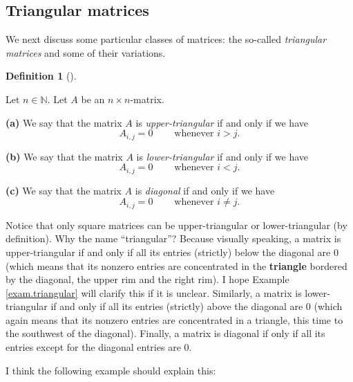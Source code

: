 \documentclass[numbers=enddot,12pt,final,onecolumn,notitlepage]{scrartcl}%
\theoremstyle{definition}
\newtheorem{defi}[theo]{Definition}
\newenvironment{definition}[1][]
{\begin{defi}[#1]\begin{leftbar}}
{\end{leftbar}\end{defi}}
\begin{document}
\subsection{Triangular matrices}

We next discuss some particular classes of matrices: the so-called
\textit{triangular matrices} and some of their variations.

\begin{definition}
\label{def.triangular}Let $n\in\mathbb{N}$. Let $A$ be an $n\times n$-matrix.

\textbf{(a)} We say that the matrix $A$ is \textit{upper-triangular} if and
only if we have%
\[
A_{i,j}=0\ \ \ \ \ \ \ \ \ \ \text{whenever }i>j.
\]


\textbf{(b)} We say that the matrix $A$ is \textit{lower-triangular} if and
only if we have%
\[
A_{i,j}=0\ \ \ \ \ \ \ \ \ \ \text{whenever }i<j.
\]


\textbf{(c)} We say that the matrix $A$ is \textit{diagonal} if and only if we
have%
\[
A_{i,j}=0\ \ \ \ \ \ \ \ \ \ \text{whenever }i\neq j.
\]

\end{definition}

Notice that only square matrices can be upper-triangular or lower-triangular
(by definition). Why the name \textquotedblleft triangular\textquotedblright?
Because visually speaking, a matrix is upper-triangular if and only if all its
entries (strictly) below the diagonal are $0$ (which means that its nonzero
entries are concentrated in the \textbf{triangle} bordered by the diagonal,
the upper rim and the right rim). I hope Example \ref{exam.triangular} will
clarify this if it is unclear. Similarly, a matrix is lower-triangular if and
only if all its entries (strictly) above the diagonal are $0$ (which again
means that its nonzero entries are concentrated in a triangle, this time to
the southwest of the diagonal). Finally, a matrix is diagonal if only if all
its entries except for the diagonal entries are $0$.

I think the following example should explain this:
\end{document}

